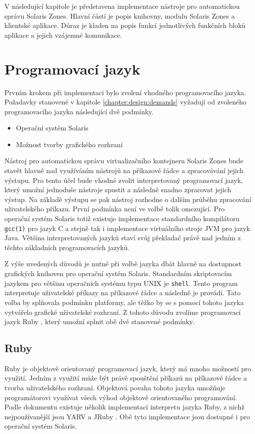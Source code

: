\label{chapter:implementation}
V následující kapitole je představena implementace nástroje pro automatickou správu Solaris Zones. Hlavní částí
je popis knihovny, modulu Solaris Zones a klientské aplikace. Důraz je kladen na popis funkcí jednotlivých funkčních
bloků aplikace a jejich vzájemné komunikace.
\section{Programovací jazyk}
\label{chapter:implementation:language}
Prvním krokem  při implementaci bylo zvolení vhodného programovacího jazyka. Požadavky stanovené v kapitole 
\ref{chapter:design:demands} vyžadují od zvoleného programovacího jazyka následující dvě podmínky.
\begin{itemize}
 \item Operační systém Solaris
 \item Možnost tvorby grafického rozhraní
\end{itemize}
Nástroj pro automatickou správu virtualizačního kontejneru Solaris Zones bude stavět hlavně nad využíváním
nástrojů na příkazové řádce a zpracovávání jejich výstupu. Pro tento účel bude vhodné zvolit interpretovaný
programovací jazyk, který umožní jednoduše nástroje spustit a následně snadno zpracovat jejich výstup. Na základě
výstupu se pak nástroj rozhodne o dalším průběhu zpracování uživatelského příkazu. První podmínka není ve volbě
tolik omezující. Pro operační systém Solaris totiž existuje implementace standardního kompilátoru \verb|gcc(1)|
pro jazyk C a stejně tak i implementace virtuálního stroje JVM pro jazyk Java. Většina interpretovaných jazyků
staví svůj překladač právě nad jedním z těchto základních programovacích jazyků.

Z výše uvedených důvodů je nutné při volbě jazyka dbát hlavně na dostupnost grafických knihoven pro operační systém
Solaris. Standardním skriptovacím jazykem pro většinu operačních systému typu UNIX je \verb|shell|. Tento program
interpretuje uživatelské příkazy na příkazové řádce a následně je provádí. Tato volba by splňovala podmínku platformy,
ale těžko by se s pomocí tohoto jazyka vytvářelo grafické uživatelské rozhraní. Z tohoto důvodu zvolíme programovací
jazyk Ruby \cite{ruby}, který umožní splnit obě dvě stanovené podmínky.
\subsection{Ruby}
\label{chapter:implementation:language:ruby}
Ruby je objektově orientovaný programovací jazyk, který má mnoho možností pro využití. Jedním z využití může být
právě spouštění příkazů na příkazové řádce a tvorba uživatelského rozhraní. Objektová povaha tohoto jazyka umožňuje
programátorovi využívat všech výhod objektově orientovaného programování. Podle dokumentu \cite{ruby:implementation}
existuje několik implementací interpretu jazyka Ruby, z nichž nejpoužívanější jsou YARV \cite{ruby:implementation:yarv} 
a JRuby \cite{ruby:implementation:jruby}. Obě tyto implementace jsou dostupné i pro operační systém Solaris.

